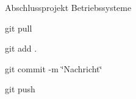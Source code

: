 Abschlussprojekt Betriebssysteme

git pull

git add .

git commit -\/m \char`\"{}\+Nachricht\char`\"{}

git push 